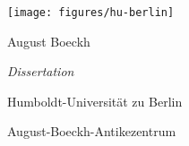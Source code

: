 
\begin{titlepage}
\hfill\texttt{[image: figures/hu-berlin]}


\vfill
\begin{center}
\Large
August Boeckh\par
\textit{Dissertation}
\end{center}
\vfill
Humboldt-Universität zu Berlin

August-Boeckh-Antikezentrum
\end{titlepage}